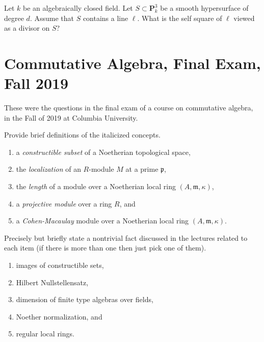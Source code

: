 \begin{exercise}
\label{exercise-self-square-line}
Let $k$ be an algebraically closed field. Let $S \subset \mathbf{P}^3_k$
be a smooth hypersurface of degree $d$. Assume that $S$ contains a
line $\ell$. What is the self square of $\ell$ viewed as a divisor on $S$?
\end{exercise}






\section{Commutative Algebra, Final Exam, Fall 2019}
\label{section-final-exam-fall-2019}

\noindent
These were the questions in the final exam of a course on commutative algebra,
in the Fall of 2019 at Columbia University.

\begin{exercise}[Definitions]
\label{exercise-definitions-fall-2019}
Provide brief definitions of the italicized concepts.
\begin{enumerate}
\item a {\it constructible subset} of a Noetherian topological space,
\item the {\it localization} of an $R$-module $M$ at a prime $\mathfrak p$,
\item the {\it length} of a module over a Noetherian local ring
$(A, \mathfrak m, \kappa)$,
\item a {\it projective module} over a ring $R$, and
\item a {\it Cohen-Macaulay} module over a
Noetherian local ring $(A, \mathfrak m, \kappa)$.
\end{enumerate}
\end{exercise}

\begin{exercise}[Theorems]
\label{exercise-results-fall-2019}
Precisely but briefly state a nontrivial fact discussed in the lectures
related to each item (if there is more than one then just pick
one of them).
\begin{enumerate}
\item images of constructible sets,
\item Hilbert Nullstellensatz,
\item dimension of finite type algebras over fields,
\item Noether normalization, and
\item regular local rings.
\end{enumerate}
\end{exercise}


